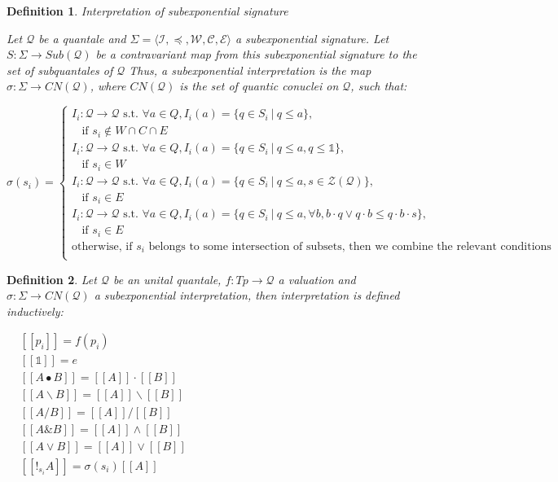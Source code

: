 \documentclass[a4paper]{article}
\theoremstyle{defin}
\newtheorem{defin}{Definition}
\theoremstyle{theorem}
\theoremstyle{prop}
\theoremstyle{lemma}
\theoremstyle{ex}
\theoremstyle{col}
\begin{document}
\begin{defin} Interpretation of subexponential signature

Let $\mathcal{Q}$ be a quantale and $\Sigma = \langle \mathcal{I}, \preceq, \mathcal{W}, \mathcal{C}, \mathcal{E} \rangle$
a subexponential signature. Let $S : \Sigma \to Sub(\mathcal{Q})$ be a contravariant map from this subexponential
signature to the set of subquantales of $\mathcal{Q}$ Thus, a subexponential interpretation is the map
$\sigma : \Sigma \to CN(\mathcal{Q})$, where $CN(\mathcal{Q})$ is the set of quantic conuclei on $\mathcal{Q}$, such that:

  $\sigma(s_i) = \begin{cases}
  I_i : \mathcal{Q} \to \mathcal{Q} \text{ s.t. } \forall a \in Q, I_i(a) = \{ q \in S_i \: | \: q \leq a\},
  \\ \:\:\:\: \text{if $s_i \notin W \cap C \cap E$} \\
  I_i : \mathcal{Q} \to \mathcal{Q} \text{ s.t. } \forall a \in Q, I_i(a) = \{ q \in S_i \: | \: q \leq a, q \leq \mathds{1}\},
  \\ \:\:\:\: \text{if $s_i \in W$} \\
  I_i : \mathcal{Q} \to \mathcal{Q} \text{ s.t. } \forall a \in Q, I_i(a) = \{ q \in S_i \: | \: q \leq a, s \in \mathcal{Z}(\mathcal{Q}) \},
  \\ \:\:\:\: \text{if $s_i \in E$} \\
  I_i : \mathcal{Q} \to \mathcal{Q} \text{ s.t. } \forall a \in Q, I_i(a) = \{ q \in S_i \: | \: q \leq a, \forall b, b \cdot q \vee q \cdot b \leq q \cdot b \cdot s \},
  \\ \:\:\:\: \text{if $s_i \in E$} \\
  \text{otherwise, if $s_i$ belongs to some intersection of subsets, then we combine the relevant conditions } \\
  \end{cases}$
\end{defin}

\begin{defin} Let $\mathcal{Q}$ be an unital quantale, $f : Tp \to \mathcal{Q}$ a valuation and $\sigma : \Sigma \to CN(\mathcal{Q})$ a subexponential interpretation, then interpretation is defined inductively:

\begin{center}
$\begin{array}{lll}
& [\![p_i]\!] = f(p_i)&\\
& [\![\mathds{1}]\!] = e & \\
&[\![A \bullet B]\!] = [\![A]\!] \cdot [\![B]\!] & \\
&[\![A \backslash B]\!] = [\![A]\!] \backslash [\![B]\!] & \\
&[\![A / B]\!] = [\![A]\!] / [\![B]\!]& \\
&[\![A \& B]\!] = [\![A]\!] \wedge [\![B]\!]& \\
&[\![A \vee B]\!] = [\![A]\!] \vee [\![B]\!]& \\
&[\![!_{s_i} A]\!] = \sigma(s_i) [\![A]\!]&
\end{array}$
\end{center}
\end{defin}
\end{document}
